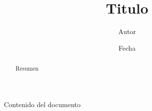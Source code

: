 \documentclass[a4paper, 10pt]{article}
\title{Titulo}
\author{Autor}
\date{Fecha}
\begin{document}
\maketitle

\begin{abstract}
Resumen
\end{abstract}


\tableofcontents

Contenido del documento
\end{document}
